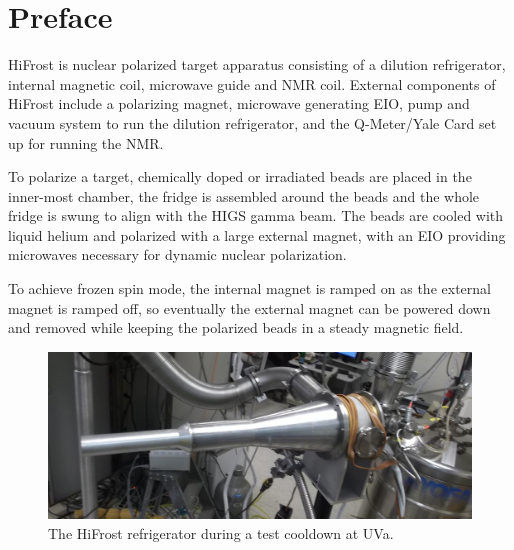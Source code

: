 \chapter*{Preface}
\thispagestyle{empty} 


HiFrost is nuclear polarized target apparatus consisting of a dilution refrigerator, internal magnetic coil, microwave guide and NMR coil.  External components of HiFrost include a polarizing magnet, microwave generating EIO, pump and vacuum system to run the dilution refrigerator, and the Q-Meter/Yale Card set up for running the NMR. 


To polarize a target, chemically doped or irradiated beads are placed in the inner-most chamber, the fridge is assembled around the beads and the whole fridge is swung to align with the HIGS gamma beam.  The beads are cooled with liquid helium and polarized with a large external magnet, with an EIO providing microwaves necessary for dynamic nuclear polarization.


To achieve frozen spin mode, the internal magnet is ramped on as the external magnet is ramped off, so eventually the external magnet can be powered down and removed while keeping the polarized beads in a steady magnetic field.

\begin{figure}[h]
 \centering
 \includegraphics[width=\textwidth]{./img/intro-image.jpg}
 \caption{The HiFrost refrigerator during a test cooldown at UVa.}
 \label{fig:intro-image}
\end{figure}
